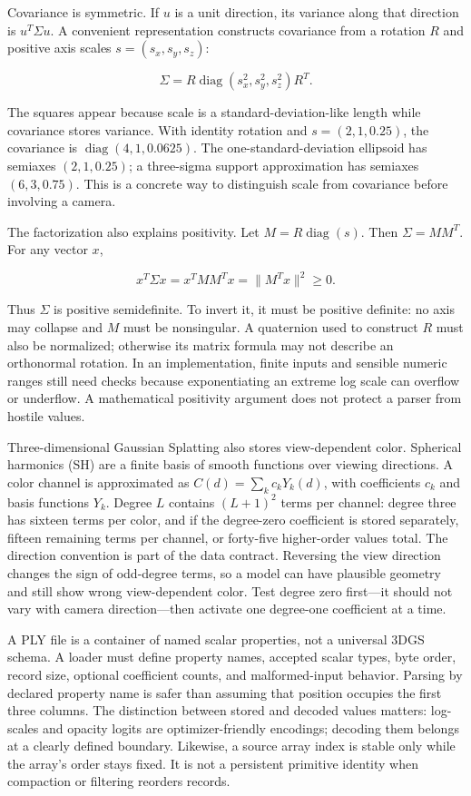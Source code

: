 Covariance is symmetric. If \(u\) is a unit direction, its variance along that direction is \(u^T\Sigma u\). A convenient representation constructs covariance from a rotation \(R\) and positive axis scales \(s=(s_x,s_y,s_z)\):

\[
\Sigma=R\operatorname{diag}(s_x^2,s_y^2,s_z^2)R^T.
\]

The squares appear because scale is a standard-deviation-like length while covariance stores variance. With identity rotation and \(s=(2,1,0.25)\), the covariance is \(\operatorname{diag}(4,1,0.0625)\). The one-standard-deviation ellipsoid has semiaxes \((2,1,0.25)\); a three-sigma support approximation has semiaxes \((6,3,0.75)\). This is a concrete way to distinguish scale from covariance before involving a camera.

The factorization also explains positivity. Let \(M=R\operatorname{diag}(s)\). Then \(\Sigma=MM^T\). For any vector \(x\),

\[
x^T\Sigma x=x^TMM^Tx=\|M^Tx\|^2\ge 0.
\]

Thus \(\Sigma\) is positive semidefinite. To invert it, it must be positive definite: no axis may collapse and \(M\) must be nonsingular. A quaternion used to construct \(R\) must also be normalized; otherwise its matrix formula may not describe an orthonormal rotation. In an implementation, finite inputs and sensible numeric ranges still need checks because exponentiating an extreme log scale can overflow or underflow. A mathematical positivity argument does not protect a parser from hostile values.

Three-dimensional Gaussian Splatting also stores view-dependent color. Spherical harmonics (SH) are a finite basis of smooth functions over viewing directions. A color channel is approximated as \(C(d)=\sum_k c_kY_k(d)\), with coefficients \(c_k\) and basis functions \(Y_k\). Degree \(L\) contains \((L+1)^2\) terms per channel: degree three has sixteen terms per color, and if the degree-zero coefficient is stored separately, fifteen remaining terms per channel, or forty-five higher-order values total. The direction convention is part of the data contract. Reversing the view direction changes the sign of odd-degree terms, so a model can have plausible geometry and still show wrong view-dependent color. Test degree zero first---it should not vary with camera direction---then activate one degree-one coefficient at a time.

A PLY file is a container of named scalar properties, not a universal 3DGS schema. A loader must define property names, accepted scalar types, byte order, record size, optional coefficient counts, and malformed-input behavior. Parsing by declared property name is safer than assuming that position occupies the first three columns. The distinction between stored and decoded values matters: log-scales and opacity logits are optimizer-friendly encodings; decoding them belongs at a clearly defined boundary. Likewise, a source array index is stable only while the array's order stays fixed. It is not a persistent primitive identity when compaction or filtering reorders records.

